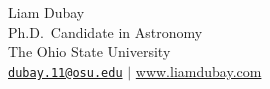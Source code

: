 \documentclass[12pt]{article}
\begin{document}
\thispagestyle{plain} %

\begin{center}
    {\huge Liam Dubay} \\
    \vspace{8pt}
    {\Large Ph.D.\ Candidate in Astronomy\\The Ohio State University} \\
    \vspace{6pt}
    {\large \href{mailto:dubay.11@osu.edu}{\texttt{dubay.11@osu.edu}} $\vert$ \url{www.liamdubay.com}}

\end{center}









\pagebreak









% 




\end{document}
